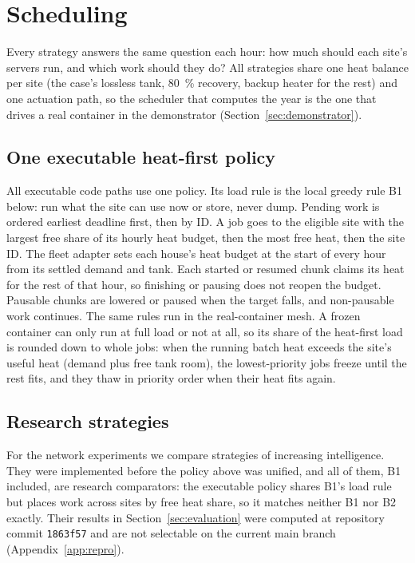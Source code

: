 \section{Scheduling}
\label{sec:scheduling}

Every strategy answers the same question each hour: how much should each site's servers run, and
which work should they do? All strategies share one heat balance per site (the case's lossless
tank, \qty{80}{\percent} recovery, backup heater for the rest) and one actuation path, so the
scheduler that computes the year is the one that drives a real container in the demonstrator
(Section~\ref{sec:demonstrator}).

\subsection{One executable heat-first policy}
\label{sec:policy}

All executable code paths use one policy. Its load rule is the local greedy rule B1 below: run what
the site can use now or store, never dump. Pending work is ordered earliest deadline first, then by
ID. A job goes to the eligible site with the largest free share of its hourly heat budget, then the
most free heat, then the site ID. The fleet adapter sets each house's heat budget at the start of
every hour from its settled demand and tank. Each started or resumed chunk claims its heat for the
rest of that hour, so finishing or pausing does not reopen the budget. Pausable chunks are lowered
or paused when the target falls, and non-pausable work continues. The same rules run in the
real-container mesh. A frozen container can only run at full load or not at all, so its share of
the heat-first load is rounded down to whole jobs: when the running batch heat exceeds the site's
useful heat (demand plus free tank room), the lowest-priority jobs freeze until the rest fits, and
they thaw in priority order when their heat fits again.

\subsection{Research strategies}

For the network experiments we compare strategies of increasing intelligence. They were implemented
before the policy above was unified, and all of them, B1 included, are research comparators: the
executable policy shares B1's load rule but places work across sites by free heat share, so it
matches neither B1 nor B2 exactly. Their results in Section~\ref{sec:evaluation} were computed at
repository commit \texttt{1863f57} and are not selectable on the current main branch
(Appendix~\ref{app:repro}).

